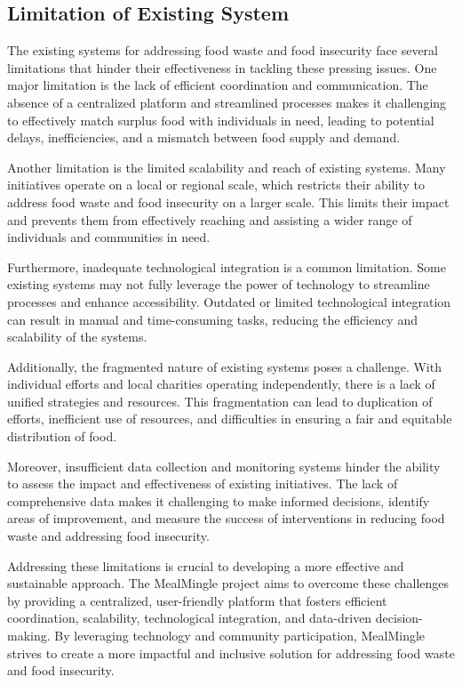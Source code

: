 \subsection{Limitation of Existing System}
The existing systems for addressing food waste and food insecurity face several limitations that hinder their effectiveness in tackling these pressing issues. One major limitation is the lack of efficient coordination and communication. The absence of a centralized platform and streamlined processes makes it challenging to effectively match surplus food with individuals in need, leading to potential delays, inefficiencies, and a mismatch between food supply and demand.

Another limitation is the limited scalability and reach of existing systems. Many initiatives operate on a local or regional scale, which restricts their ability to address food waste and food insecurity on a larger scale. This limits their impact and prevents them from effectively reaching and assisting a wider range of individuals and communities in need.

Furthermore, inadequate technological integration is a common limitation. Some existing systems may not fully leverage the power of technology to streamline processes and enhance accessibility. Outdated or limited technological integration can result in manual and time-consuming tasks, reducing the efficiency and scalability of the systems.

Additionally, the fragmented nature of existing systems poses a challenge. With individual efforts and local charities operating independently, there is a lack of unified strategies and resources. This fragmentation can lead to duplication of efforts, inefficient use of resources, and difficulties in ensuring a fair and equitable distribution of food.

Moreover, insufficient data collection and monitoring systems hinder the ability to assess the impact and effectiveness of existing initiatives. The lack of comprehensive data makes it challenging to make informed decisions, identify areas of improvement, and measure the success of interventions in reducing food waste and addressing food insecurity.

Addressing these limitations is crucial to developing a more effective and sustainable approach. The MealMingle project aims to overcome these challenges by providing a centralized, user-friendly platform that fosters efficient coordination, scalability, technological integration, and data-driven decision-making. By leveraging technology and community participation, MealMingle strives to create a more impactful and inclusive solution for addressing food waste and food insecurity.

